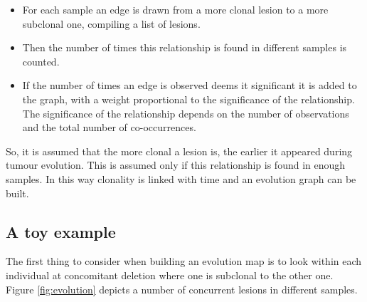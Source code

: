   \begin{multicols}{2}
    \begin{itemize}
      \item For each sample an edge is drawn from a more clonal lesion to a more subclonal one, compiling a list of lesions.
      \item Then the number of times this relationship is found in different samples is counted.
      \item If the number of times an edge is observed deems it significant it is added to the graph, with a weight proportional to the significance of the relationship.
        The significance of the relationship depends on the number of observations and the total number of co-occurrences.
    \end{itemize}
  \end{multicols}

  So, it is assumed that the more clonal a lesion is, the earlier it appeared during tumour evolution.
  This is assumed only if this relationship is found in enough samples.
  In this way clonality is linked with time and an evolution graph can be built.

  \subsection{A toy example}
  The first thing to consider when building an evolution map is to look within each individual at concomitant deletion where one is subclonal to the other one.
  Figure \ref{fig:evolution} depicts a number of concurrent lesions in different samples.

